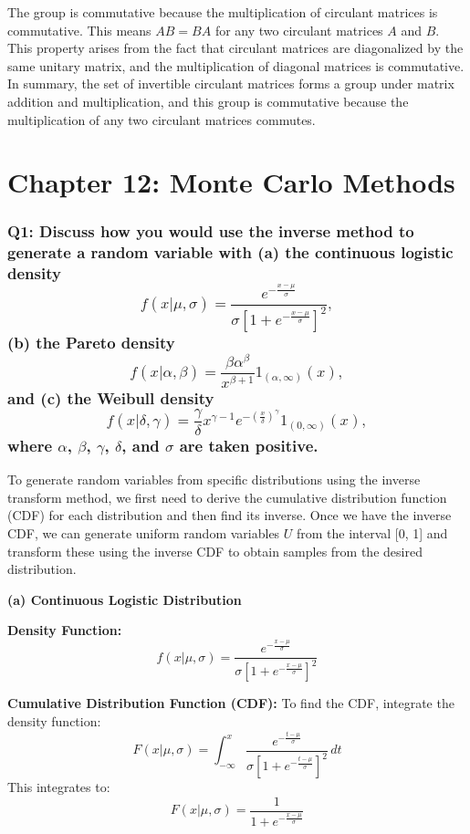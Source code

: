 \documentclass[8pt]{article}
\begin{document}
The group is commutative because the multiplication of circulant matrices is commutative. This means $AB=BA$ for any two circulant matrices $A$ and $B$. This property arises from the fact that circulant matrices are diagonalized by the same unitary matrix, and the multiplication of diagonal matrices is commutative.\\

In summary, the set of invertible circulant matrices forms a group under matrix addition and multiplication, and this group is commutative because the multiplication of any two circulant matrices commutes.


\newpage
\section*{Chapter 12: Monte Carlo Methods}

\subsubsection*{Q1:
Discuss how you would use the inverse method to generate a random variable with (a) the continuous logistic density
\[
f(x|\mu, \sigma) = \frac{e^{-\frac{x-\mu}{\sigma}}}{\sigma [1 + e^{-\frac{x-\mu}{\sigma}}]^2},
\]
(b) the Pareto density
\[
f(x|\alpha, \beta) = \frac{\beta \alpha^\beta}{x^{\beta+1}} 1_{(\alpha, \infty)}(x),
\]
and (c) the Weibull density
\[
f(x|\delta, \gamma) = \frac{\gamma}{\delta} x^{\gamma-1} e^{-\left(\frac{x}{\delta}\right)^\gamma} 1_{(0, \infty)}(x),
\]
where \(\alpha\), \(\beta\), \(\gamma\), \(\delta\), and \(\sigma\) are taken positive.}

To generate random variables from specific distributions using the inverse transform method, we first need to derive the cumulative distribution function (CDF) for each distribution and then find its inverse. Once we have the inverse CDF, we can generate uniform random variables \( U \) from the interval [0, 1] and transform these using the inverse CDF to obtain samples from the desired distribution.

\textbf{(a) Continuous Logistic Distribution}

\textbf{Density Function:}
\[
f(x|\mu, \sigma) = \frac{e^{-\frac{x-\mu}{\sigma}}}{\sigma [1 + e^{-\frac{x-\mu}{\sigma}}]^2}
\]

\textbf{Cumulative Distribution Function (CDF):}
To find the CDF, integrate the density function:
\[
F(x|\mu, \sigma) = \int_{-\infty}^x \frac{e^{-\frac{t-\mu}{\sigma}}}{\sigma [1 + e^{-\frac{t-\mu}{\sigma}}]^2} \, dt
\]
This integrates to:
\[
F(x|\mu, \sigma) = \frac{1}{1 + e^{-\frac{x-\mu}{\sigma}}}
\]
\end{document}
